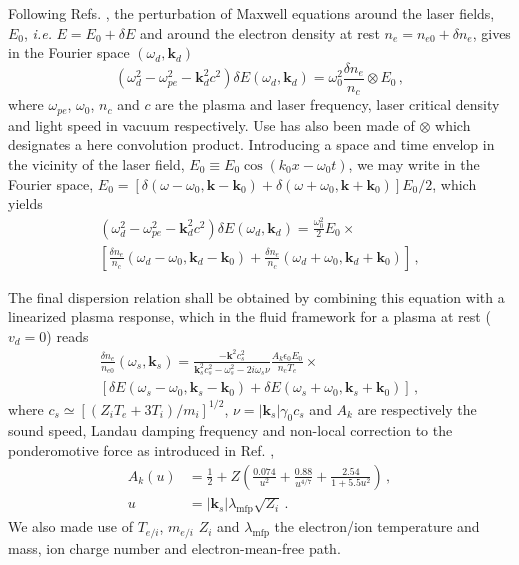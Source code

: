 \documentclass[
 reprint,
 amsmath,amssymb,
 aps,
]{revtex4-1}
\begin{document}
Following Refs. \cite[]{Kruer,phd_Michel}, the perturbation of Maxwell equations around the laser fields, $E_0$, \emph{i.e.} $E = E_0 + \delta E$ and around the  electron density at rest $n_e = n_{e0}+\delta n_e$, gives in the Fourier space $(\omega_d,\mathbf{k}_d)$
\begin{equation}
    (\omega_d^2 - \omega_{pe}^2 -\mathbf{k}_d^2c^2)\delta E(\omega_d,\mathbf{k}_d) = \omega_0^2 \frac{\delta n_e }{n_c}\otimes E_0  \, ,\label{eq:max1}
\end{equation}
where $\omega_{pe}$, $\omega_{0}$,  $n_c$ and $c$ are the plasma and laser frequency, laser critical density and light speed in vacuum respectively. Use has also been made of $\otimes$ which designates a here convolution product.
Introducing a space and time envelop in the vicinity of the laser field, $E_0\equiv E_0 \cos(k_0 x - \omega_0t  )$,
we may write in the Fourier space,  $E_0 =[ \delta(\omega-\omega_0, \mathbf{k}-\mathbf{k}_0) + \delta(\omega+\omega_0, \mathbf{k}+\mathbf{k}_0) ]E_0/2 $, which yields 
\begin{align}
    (\omega_d^2 - \omega_{pe}^2 -\mathbf{k}_d^2c^2)\delta E(\omega_d,\mathbf{k}_d) = \frac{\omega_0^2}{2} E_0\times \nonumber\\ \left[\frac{\delta n_e }{n_c}(\omega_d-\omega_0, \mathbf{k}_d-\mathbf{k}_0) +\frac{\delta n_e }{n_c}(\omega_d+\omega_0, \mathbf{k}_d+\mathbf{k}_0) \right] \, ,\label{eq:max2}
\end{align}

The final dispersion relation  shall be obtained by combining this equation with a linearized plasma response, which in the fluid framework for a plasma at rest ($v_d=0$) reads 
\begin{align}
   \frac{\delta n_e }{n_{e0}}(\omega_s,\mathbf{k}_s) = \frac{-\mathbf{k}^2c_s^2}{ \mathbf{k}_s^2c_s^2-\omega_s^2 -2i\omega_s \nu} \frac{A_k\epsilon_0 E_0}{n_c T_e}\times \nonumber\\ \left[\delta E(\omega_s-\omega_0, \mathbf{k}_s-\mathbf{k}_0) +\delta E(\omega_s+\omega_0, \mathbf{k}_s+\mathbf{k}_0) \right] \, ,\label{eq:fluid}
\end{align}
where $c_s\simeq [(Z_iT_e+3 T_i)/m_i]^{1/2}$, $\nu=\vert\mathbf{k}_s\vert \gamma_0 c_s$ and $A_k$ are respectively  the sound speed, Landau damping frequency and non-local correction to the ponderomotive force  as introduced in Ref. \cite[]{Bychenkov_2000}, 
\begin{align}
     A_k(u)   &= \frac{1}{2} +Z\left( \frac{0.074}{u^2}+ \frac{0.88}{u^{4/7}} + \frac{2.54}{1+5.5u^2} \right) \, ,\nonumber \\ 
     u &=\vert \mathbf{k}_s \vert\lambda_\mathrm{mfp} \sqrt{Z_i}\label{eq:nl}\, .
\end{align}
We also made use of $T_{e/i}$, $m_{e/i}$ $Z_i$ and $\lambda_\mathrm{mfp}$ the electron/ion temperature and mass, ion charge number and electron-mean-free path.
\end{document}
